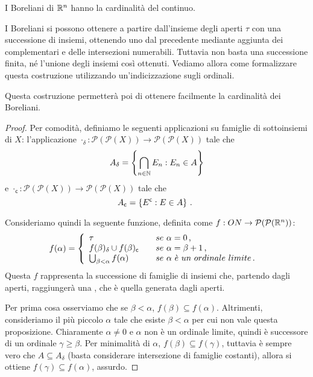 \begin{proposition}\label{prop:CardBoreliani}
	I Boreliani di $\mathbb R^n$ hanno la cardinalità del continuo.
\end{proposition}
\begin{remark}
	I Boreliani si possono ottenere a partire dall'insieme degli aperti $\tau$ con una successione di insiemi, ottenendo uno dal precedente
	mediante aggiunta dei complementari e delle intersezioni numerabili. Tuttavia non basta una successione finita, né l'unione degli insiemi
	così ottenuti. Vediamo allora come formalizzare questa costruzione utilizzando un'indicizzazione sugli ordinali.
	
	Questa costruzione permetterà poi di ottenere facilmente la cardinalità dei Boreliani.
\end{remark}
\begin{proof}%
	Per comodità, definiamo le seguenti applicazioni su famiglie di sottoinsiemi di $X$:
	l'applicazione $\cdot_{\delta}:\mathcal{P}(\mathcal{P}(X)) \rightarrow \mathcal{P}(\mathcal{P}(X))$ tale che
	\[
		A_{\delta} = \left\{ \bigcap_{n\in\mathbb N}E_n : E_n\in A \right\}
	\]
	e $\cdot_{\mathsf{c}}:\mathcal{P}(\mathcal{P}(X)) \rightarrow \mathcal{P}(\mathcal{P}(X))$ tale che
	\[
		A_{\mathsf{c}} = \left\{ E^\mathsf{c} : E\in A \right\} \, \text{. }
	\]
	
	Consideriamo quindi la seguente funzione, definita come $f:ON \rightarrow \mathcal{P}(\mathcal{P}(\mathbb R^n))$:
	\[
	f(\alpha) = \left\{
		\begin{array}{ll}
			\tau & \quad se\ \alpha=0 \virgola \\
			f(\beta)_{\delta}\cup f(\beta)_{\mathsf{c}} & \quad se\ \alpha=\beta+1 \virgola\\
			\bigcup_{\beta < \alpha}f(\alpha) & \quad se\ \alpha\ \grave{e}\ un\ ordinale\ limite \punto
		\end{array}
	\right.
	\]
	Questa $f$ rappresenta la successione di famiglie di insiemi che, partendo dagli aperti, raggiungerà una \sigalg,
	che è quella generata dagli aperti.
	
	Per prima cosa osserviamo che se $\beta < \alpha$, $f(\beta)\subseteq f(\alpha)$. Altrimenti, consideriamo il più piccolo $\alpha$
	tale che esiste $\beta<\alpha$ per cui non vale questa proposizione. Chiaramente $\alpha\neq 0$ e $\alpha$ non è un ordinale limite,
	quindi è successore di un ordinale $\gamma\geq \beta$. Per minimalità di $\alpha$, $f(\beta)\subseteq f(\gamma)$, tuttavia è sempre vero
	che $A\subseteq A_{\delta}$ (basta considerare intersezione di famiglie costanti), allora si ottiene $f(\gamma)\subseteq f(\alpha)$, assurdo.
	

\end{proof}
